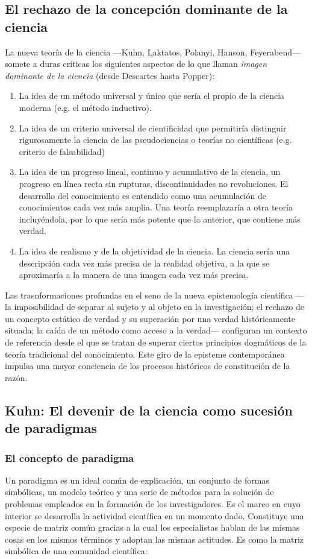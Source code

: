 \documentclass[a4paper, 11pt, twocolumn, spanish]{article}
\begin{document}
\subsection{El rechazo de la concepción dominante de la ciencia}
\label{sec:org3736d3a}
La nueva teoría de la ciencia —Kuhn, Laktatos, Polanyi, Hanson,
Feyerabend— somete a duras críticas los siguientes aspectos de lo que
llaman \emph{imagen dominante de la ciencia} (desde Descartes hasta Popper):
\begin{enumerate}
\item La idea de un método universal y único que sería el propio de la
ciencia moderna (e.g. el método inductivo).
\item La idea de un criterio universal de cientificidad que permitiría
distinguir rigurosamente la ciencia de las pseudociencias o
teorías no científicas (e.g. criterio de falsabilidad)
\item La idea de un progreso lineal, continuo y acumulativo de la
ciencia, un progreso en línea recta sin rupturas,
discontinuidades no revoluciones. El desarrollo del conocimiento
es entendido como una acumulación de conocimientos cada vez más
amplia. Una teoría reemplazaría a otra teoría incluyéndola, por
lo que sería más potente que la anterior, que contiene más
verdad.
\item La idea de realismo y de la objetividad de la ciencia. La ciencia
sería una descripción cada vez más precisa de la realidad
objetiva, a la que se aproximaría a la manera de una imagen cada
vez más precisa.
\end{enumerate}

Las trasnformaciones profundas en el seno de la nueva epistemología
científica —la imposibilidad de separar al sujeto y al objeto en la
investigación; el rechazo de un concepto estático de verdad y su
superación por una verdad históricamente situada; la caída de un
método como acceso a la verdad— configuran un contexto de referencia
desde el que se tratan de superar ciertos principios dogmáticos de la
teoría tradicional del conocimiento. Este giro de la episteme
contemporánea impulsa una mayor conciencia de los procesos históricos
de constitución de la razón.

\subsection{Kuhn: El devenir de la ciencia como sucesión de paradigmas}
\label{sec:org7c2a7a6}

\subsubsection{El concepto de paradigma}
\label{sec:org6d3f29a}
Un paradigma es un ideal común de explicación, un conjunto de formas
simbólicas, un modelo teórico y una serie de métodos para la solución
de problemas empleados en la formación de los investigadores. Es el
marco en cuyo interior se desarrolla la actividad científica en un
momento dado. Constituye una especie de matriz común gracias a la cual
los especialistas hablan de las mismas cosas en los mismos términos y
adoptan las mismas actitudes. Es como la matriz simbólica de una
comunidad científica:
\end{document}
